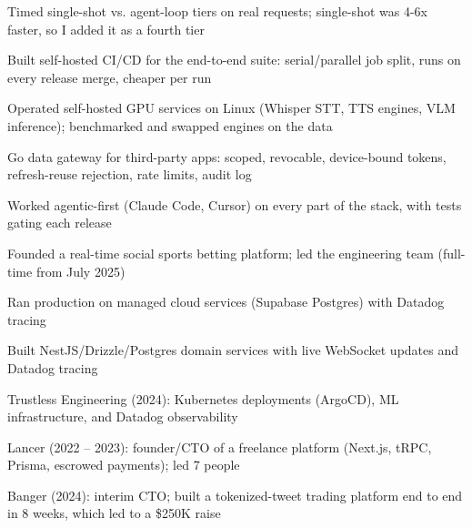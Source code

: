 \documentclass[print]{jack-resume}
\begin{document}
\begin{tightemize}
    \item Timed single-shot vs. agent-loop tiers on real requests; single-shot was 4-6x faster, so I added it as a fourth tier
    \item Built self-hosted CI/CD for the end-to-end suite: serial/parallel job split, runs on every release merge, cheaper per run
    \item Operated self-hosted GPU services on Linux (Whisper STT, TTS engines, VLM inference); benchmarked and swapped engines on the data
    \item Go data gateway for third-party apps: scoped, revocable, device-bound tokens, refresh-reuse rejection, rate limits, audit log
    \item Worked agentic-first (Claude Code, Cursor) on every part of the stack, with tests gating each release
\end{tightemize}
\sectionsep

\begin{tightemize}
    \item Founded a real-time social sports betting platform; led the engineering team (full-time from July 2025)
    \item Ran production on managed cloud services (Supabase Postgres) with Datadog tracing
    \item Built NestJS/Drizzle/Postgres domain services with live WebSocket updates and Datadog tracing
\end{tightemize}
\sectionsep

\begin{tightemize}
    \item Trustless Engineering (2024): Kubernetes deployments (ArgoCD), ML infrastructure, and Datadog observability
    \item Lancer (2022 -- 2023): founder/CTO of a freelance platform (Next.js, tRPC, Prisma, escrowed payments); led 7 people
    \item Banger (2024): interim CTO; built a tokenized-tweet trading platform end to end in 8 weeks, which led to a \$250K raise
\end{tightemize}
\sectionsep
\end{document}
